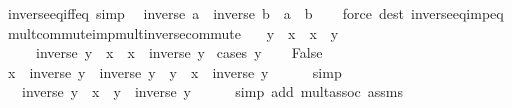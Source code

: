 \begin{isabellebody}
%
\endisadelimproof
\isanewline
{}\isamarkupfalse%
\ inverse{\isacharunderscore}{\kern0pt}eq{\isacharunderscore}{\kern0pt}iff{\isacharunderscore}{\kern0pt}eq\ {\isacharbrackleft}{\kern0pt}simp{\isacharbrackright}{\kern0pt}{\isacharcolon}{\kern0pt}\isanewline
\ \ {\isachardoublequoteopen}inverse\ a\ {\isacharequal}{\kern0pt}\ inverse\ b\ {\isasymlongleftrightarrow}\ a\ {\isacharequal}{\kern0pt}\ b{\isachardoublequoteclose}\isanewline
%
\isadelimproof
\ \ %
\endisadelimproof
%
\isatagproof
{}\isamarkupfalse%
\ {\isacharparenleft}{\kern0pt}force\ dest{\isacharbang}{\kern0pt}{\isacharcolon}{\kern0pt}\ inverse{\isacharunderscore}{\kern0pt}eq{\isacharunderscore}{\kern0pt}imp{\isacharunderscore}{\kern0pt}eq{\isacharparenright}{\kern0pt}%
\endisatagproof
{\isafoldproof}%
%
\isadelimproof
\isanewline
%
\endisadelimproof
\isanewline
{}\isamarkupfalse%
\ mult{\isacharunderscore}{\kern0pt}commute{\isacharunderscore}{\kern0pt}imp{\isacharunderscore}{\kern0pt}mult{\isacharunderscore}{\kern0pt}inverse{\isacharunderscore}{\kern0pt}commute{\isacharcolon}{\kern0pt}\isanewline
\ \ \ {\isachardoublequoteopen}y\ {\isacharasterisk}{\kern0pt}\ x\ {\isacharequal}{\kern0pt}\ x\ {\isacharasterisk}{\kern0pt}\ y{\isachardoublequoteclose}\isanewline
\ \ \ \ \ {\isachardoublequoteopen}inverse\ y\ {\isacharasterisk}{\kern0pt}\ x\ {\isacharequal}{\kern0pt}\ x\ {\isacharasterisk}{\kern0pt}\ inverse\ y{\isachardoublequoteclose}\isanewline
%
\isadelimproof
%
\endisadelimproof
%
\isatagproof
{}\isamarkupfalse%
\ {\isacharparenleft}{\kern0pt}cases\ {\isachardoublequoteopen}y{\isacharequal}{\kern0pt}{}{\isachardoublequoteclose}{\isacharparenright}{\kern0pt}\isanewline
\ \ \isamarkupfalse%
\ False\isanewline
\ \ \isamarkupfalse%
\ {\isachardoublequoteopen}x\ {\isacharasterisk}{\kern0pt}\ inverse\ y\ {\isacharequal}{\kern0pt}\ inverse\ y\ {\isacharasterisk}{\kern0pt}\ y\ {\isacharasterisk}{\kern0pt}\ x\ {\isacharasterisk}{\kern0pt}\ inverse\ y{\isachardoublequoteclose}\isanewline
\ \ \ \ \isamarkupfalse%
\ simp\isanewline
\ \ \isamarkupfalse%
\ \isamarkupfalse%
\ {\isachardoublequoteopen}{\isasymdots}\ {\isacharequal}{\kern0pt}\ inverse\ y\ {\isacharasterisk}{\kern0pt}\ {\isacharparenleft}{\kern0pt}x\ {\isacharasterisk}{\kern0pt}\ y\ {\isacharasterisk}{\kern0pt}\ inverse\ y{\isacharparenright}{\kern0pt}{\isachardoublequoteclose}\isanewline
\ \ \ \ \isamarkupfalse%
\ {\isacharparenleft}{\kern0pt}simp\ add{\isacharcolon}{\kern0pt}\ mult{\isachardot}{\kern0pt}assoc\ assms{\isacharparenright}{\kern0pt}\isanewline

\end{isabellebody}
